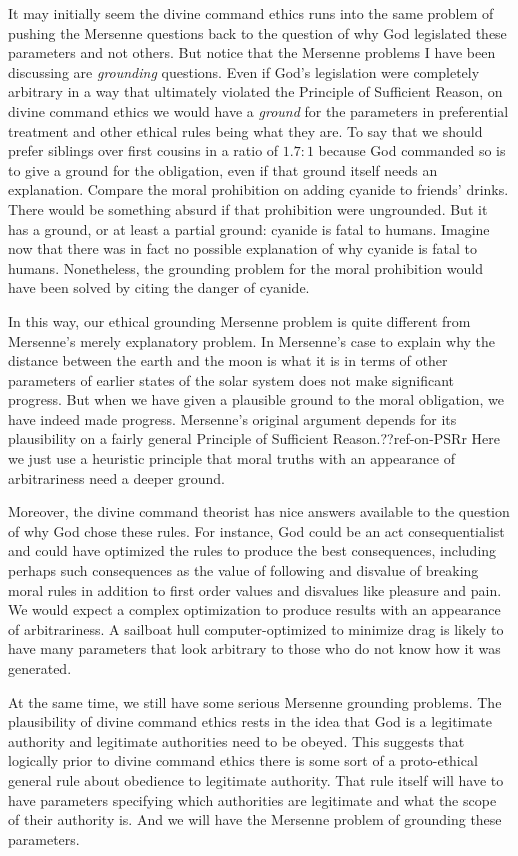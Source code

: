 It may initially seem the divine command ethics runs into the same problem of pushing the Mersenne questions back to the
question of why God legislated these parameters and not others. But notice that the Mersenne problems I have been discussing
are \textit{grounding} questions. Even if God's legislation were completely arbitrary in a way that ultimately violated the
Principle of Sufficient Reason, on divine command ethics we would have a \textit{ground} for the parameters in preferential
treatment and other ethical rules being what they are. To say that we should prefer siblings over first cousins in a ratio
of $1.7:1$ because God commanded so is to give a ground for the obligation, even if that ground itself needs an explanation.
Compare the moral prohibition on adding cyanide to friends' drinks. There would be something absurd if that prohibition were
ungrounded. But it has a ground, or at least a partial ground: cyanide is fatal to humans. Imagine now that there was in fact 
no possible explanation of why cyanide is fatal to humans. Nonetheless, the grounding problem for the moral prohibition would
have been solved by citing the danger of cyanide.

In this way, our ethical grounding Mersenne problem is quite different from Mersenne's merely explanatory problem. In Mersenne's case
to explain why the distance between the earth and the moon is what it is in terms of other parameters of earlier states of the
solar system does not make significant progress. But when we have given a plausible ground to the moral obligation, we have
indeed made progress. Mersenne's original argument depends for its plausibility on a fairly general Principle of Sufficient
Reason.??ref-on-PSRr Here we just use a heuristic principle that moral truths with
an appearance of arbitrariness need a deeper ground.

Moreover, the divine command theorist has nice answers available to the question of why God chose these rules. For instance,
God could be an act consequentialist and could have optimized the rules to produce the best consequences, including perhaps
such consequences as the value of following and disvalue of breaking moral rules in addition to first order values and 
disvalues like pleasure and pain.  We would expect a complex optimization to produce results with an appearance of arbitrariness.
A sailboat hull computer-optimized to minimize drag is likely to have many parameters that look arbitrary to those who do not
know how it was generated.

At the same time, we still have some serious Mersenne grounding problems. The plausibility of divine command ethics rests in
the idea that God is a legitimate authority and legitimate authorities need to be obeyed. This suggests that logically prior
to divine command ethics there is some sort of a proto-ethical general rule about obedience to legitimate authority. That 
rule itself will have to have parameters specifying which authorities are legitimate and what the scope of their authority is. 
And we will have the Mersenne problem of grounding these parameters.

